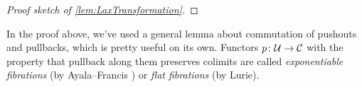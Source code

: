 \begin{proof}[Proof sketch of \cref{lem:LaxTransformation}]
\end{proof}

In the proof above, we've used a general lemma about commutation of pushouts and pullbacks, which is pretty useful on its own. Functors $p\colon \mathcal{U}\rightarrow \mathcal{C}$ with the property that pullback along them preserves colimits are called \emph{exponentiable fibrations} (by Ayala--Francis \cite{AyalaFrancisFibrations}) or \emph{flat fibrations} (by Lurie).

